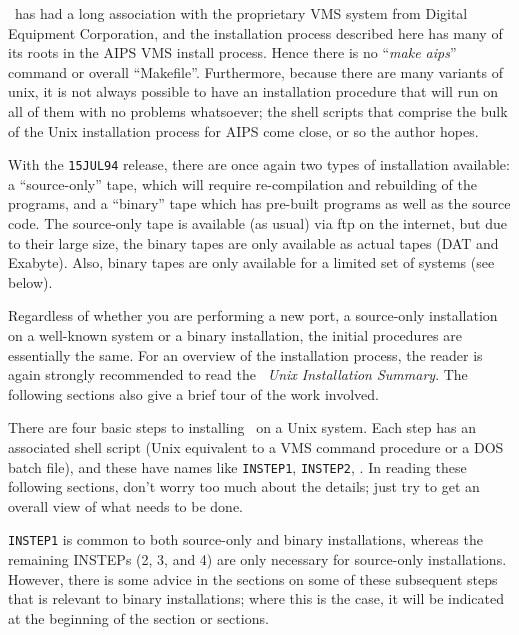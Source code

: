 \AIPS\ has had a long association with the proprietary VMS system from
Digital Equipment Corporation, and the installation process described here
has many of its roots in the AIPS VMS install process.  Hence there is no
``{\it make aips\/}'' command or overall ``Makefile''.  Furthermore,
because there are many variants of unix, it is not always possible to have
an installation procedure that will run on all of them with no problems
whatsoever; the shell scripts that comprise the bulk of the Unix
installation process for AIPS come close, or so the author hopes.


With the {\tt 15JUL94} release, there are once again two types of
installation available: a ``source-only'' tape, which will require
re-compilation and rebuilding of the programs, and a ``binary'' tape which
has pre-built programs as well as the source code.  The source-only tape
is available (as usual) via ftp on the internet, but due to their large
size, the binary tapes are only available as actual tapes (DAT and
Exabyte).  Also, binary tapes are only available for a limited set of
systems (see below).

Regardless of whether you are performing a new port, a source-only
installation on a well-known system or a binary installation, the initial
procedures are essentially the same.  For an overview of the installation
process, the reader is again strongly recommended to read the {\it \aips\
Unix Installation Summary\/}.  The following sections also give a brief
tour of the work involved. \medskip


There are four basic steps to installing \aips\ on a Unix system.  Each
step has an associated shell script (Unix equivalent to a VMS command
procedure or a DOS batch file), and these have names like {\tt INSTEP1},
{\tt INSTEP2}, \etc.  In reading these following sections, don't worry too
much about the details; just try to get an overall view of what needs to
be done.

{\tt INSTEP1} is common to both source-only and binary installations,
whereas the remaining INSTEPs (2, 3, and 4) are only necessary for
source-only installations.  However, there is some advice in the sections
on some of these subsequent steps that is relevant to binary
installations; where this is the case, it will be indicated at the
beginning of the section or sections.

\medskip{}

